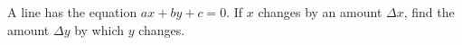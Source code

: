 A line has the equation $ax+by+c=0$. If $x$ changes by
an amount $\Delta x$, find the amount $\Delta y$ by which $y$ changes.\answercheck
